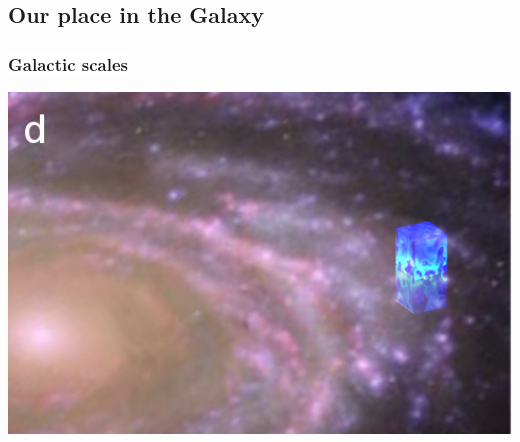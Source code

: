 \documentclass{beamer}
\newcommand{\kpc}{\,{\rm kpc}}
\begin{document}
  \subsection{Our place in the Galaxy}
  \begin{frame}
    \frametitle{\colorbox{white}{Galactic scales}}
      \includegraphics[trim=1.8cm 0cm -1cm 2cm,clip=true,width=1.15\textwidth]{spiralbox.png}
  \end{frame}
\end{document}
